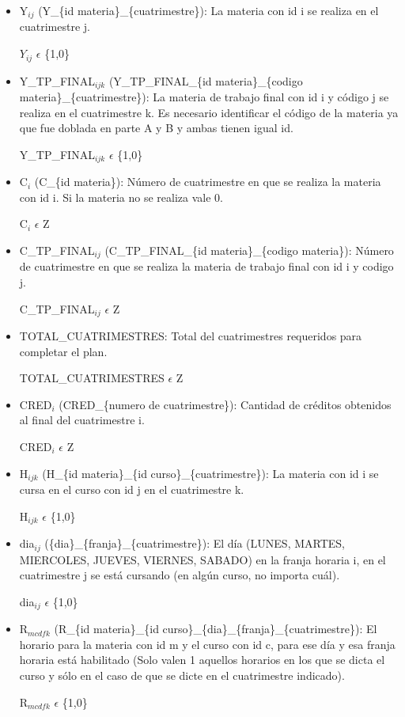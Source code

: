 \documentclass[a4paper]{article}
\begin{document}
\begin{itemize}
	\item Y$_{ij}$ (Y\_\{id materia\}\_\{cuatrimestre\}): La materia con id i se realiza en el cuatrimestre j.

	$Y_{ij}$ $\epsilon$ \{1,0\}


	\item Y\_TP\_FINAL$_{ijk}$ (Y\_TP\_FINAL\_\{id materia\}\_\{codigo materia\}\_\{cuatrimestre\}): La materia de trabajo final con id i y código j se realiza en el cuatrimestre k. Es necesario identificar el código de la materia ya que fue doblada en parte A y B y ambas tienen igual id. 

	Y\_TP\_FINAL$_{ijk}$ $\epsilon$ \{1,0\}


	\item C$_{i}$ (C\_\{id materia\}): Número de cuatrimestre en que se realiza la materia con id i. Si la materia no se realiza vale 0.

	C$_{i}$ $\epsilon$ Z


	\item C\_TP\_FINAL$_{ij}$ (C\_TP\_FINAL\_\{id materia\}\_\{codigo materia\}): Número de cuatrimestre en que se realiza la materia de trabajo final con id i y codigo j.

	 C\_TP\_FINAL$_{ij}$ $\epsilon$ Z
	 
	 
	\item TOTAL\_CUATRIMESTRES: Total del cuatrimestres requeridos para completar el plan.

	TOTAL\_CUATRIMESTRES $\epsilon$ Z


	\item CRED$_{i}$ (CRED\_\{numero de cuatrimestre\}): Cantidad de créditos obtenidos al final del cuatrimestre i.

	CRED$_{i}$ $\epsilon$ Z


	\item H$_{ijk}$ (H\_\{id materia\}\_\{id curso\}\_\{cuatrimestre\}): La materia con id i se cursa en el curso con id j en el cuatrimestre k.

	H$_{ijk}$ $\epsilon$ \{1,0\}
	
	
	\item dia$_{ij}$ (\{dia\}\_\{franja\}\_\{cuatrimestre\}): El día  (LUNES, MARTES, MIERCOLES, JUEVES, VIERNES, SABADO) en la franja horaria i, en el cuatrimestre j se está cursando (en algún curso, no importa cuál).

	dia$_{ij}$ $\epsilon$ \{1,0\}


	\item R$_{mcdfk}$ (R\_\{id materia\}\_\{id curso\}\_\{dia\}\_\{franja\}\_\{cuatrimestre\}): El horario para la materia con id m y el curso con id c, para ese día y esa franja horaria está habilitado (Solo valen 1 aquellos horarios en los que se dicta el curso y sólo en el caso de que se dicte en el cuatrimestre indicado).

	R$_{mcdfk}$ $\epsilon$ \{1,0\}

\end{itemize}
\end{document}
